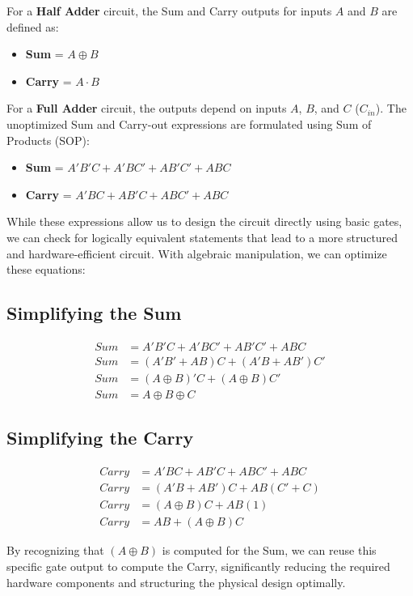 \documentclass[11pt, a4paper]{article}
\begin{document}
For a \textbf{Half Adder} circuit, the Sum and Carry outputs for inputs $A$ and $B$ are defined as:
\begin{itemize}
    \item \textbf{Sum} = $A \oplus B$
    \item \textbf{Carry} = $A \cdot B$
\end{itemize}

For a \textbf{Full Adder} circuit, the outputs depend on inputs $A$, $B$, and $C$ ($C_{in}$). The unoptimized Sum and Carry-out expressions are formulated using Sum of Products (SOP):
\begin{itemize}
    \item \textbf{Sum} = $A'B'C + A'BC' + AB'C' + ABC$
    \item \textbf{Carry} = $A'BC + AB'C + ABC' + ABC$
\end{itemize}

While these expressions allow us to design the circuit directly using basic gates, we can check for logically equivalent statements that lead to a more structured and hardware-efficient circuit. With algebraic manipulation, we can optimize these equations:

\subsection{Simplifying the Sum}
\begin{align*}
Sum &= A'B'C + A'BC' + AB'C' + ABC \\
Sum &= (A'B' + AB)C + (A'B + AB')C' \\
Sum &= (A \oplus B)'C + (A \oplus B)C' \\
Sum &= A \oplus B \oplus C
\end{align*}

\subsection{Simplifying the Carry}
\begin{align*}
Carry &= A'BC + AB'C + ABC' + ABC \\
Carry &= (A'B + AB')C + AB(C' + C) \\
Carry &= (A \oplus B)C + AB(1) \\
Carry &= AB + (A \oplus B)C
\end{align*}

By recognizing that $(A \oplus B)$ is computed for the Sum, we can reuse this specific gate output to compute the Carry, significantly reducing the required hardware components and structuring the physical design optimally.
\end{document}
